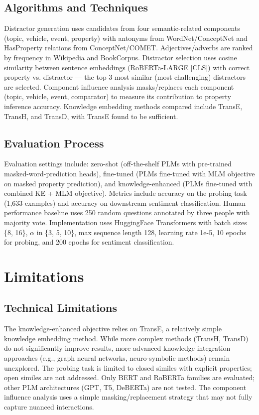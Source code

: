 \documentclass[12pt]{article}
\begin{document}
\subsection{Algorithms and Techniques}

Distractor generation uses candidates from four semantic-related components (topic, vehicle, event, property) with antonyms from WordNet/ConceptNet and HasProperty relations from ConceptNet/COMET. Adjectives/adverbs are ranked by frequency in Wikipedia and BookCorpus. Distractor selection uses cosine similarity between sentence embeddings (RoBERTa-LARGE [CLS]) with correct property vs. distractor --- the top 3 most similar (most challenging) distractors are selected. Component influence analysis masks/replaces each component (topic, vehicle, event, comparator) to measure its contribution to property inference accuracy. Knowledge embedding methods compared include TransE, TransH, and TransD, with TransE found to be sufficient.

\subsection{Evaluation Process}

Evaluation settings include: zero-shot (off-the-shelf PLMs with pre-trained masked-word-prediction heads), fine-tuned (PLMs fine-tuned with MLM objective on masked property prediction), and knowledge-enhanced (PLMs fine-tuned with combined KE + MLM objective). Metrics include accuracy on the probing task (1,633 examples) and accuracy on downstream sentiment classification. Human performance baseline uses 250 random questions annotated by three people with majority vote. Implementation uses HuggingFace Transformers with batch sizes \{8, 16\}, $\alpha$ in \{3, 5, 10\}, max sequence length 128, learning rate 1e-5, 10 epochs for probing, and 200 epochs for sentiment classification.

\section{Limitations}

\subsection{Technical Limitations}

The knowledge-enhanced objective relies on TransE, a relatively simple knowledge embedding method. While more complex methods (TransH, TransD) do not significantly improve results, more advanced knowledge integration approaches (e.g., graph neural networks, neuro-symbolic methods) remain unexplored. The probing task is limited to closed similes with explicit properties; open similes are not addressed. Only BERT and RoBERTa families are evaluated; other PLM architectures (GPT, T5, DeBERTa) are not tested. The component influence analysis uses a simple masking/replacement strategy that may not fully capture nuanced interactions.
\end{document}
